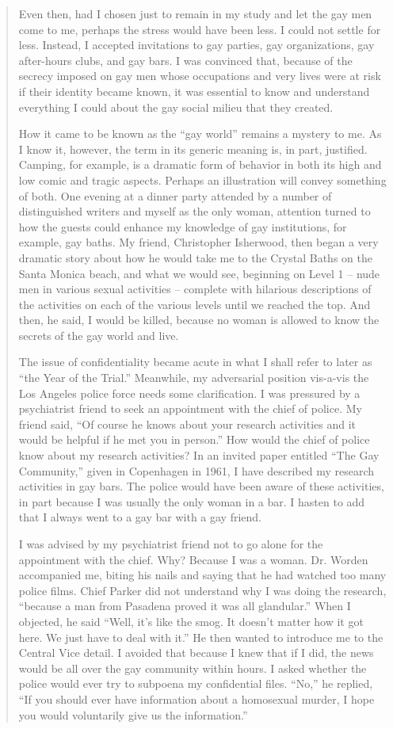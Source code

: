 \begin{refsection}
\begin{quote}
Even then, had I chosen just to remain in my study and let the gay men come to me, perhaps the stress would have been less. I could not settle for less. Instead, I accepted invitations to gay parties, gay organizations, gay after-hours clubs, and gay bars. I was convinced that, because of the secrecy imposed on gay men whose occupations and very lives were at risk if their identity became known, it was essential to know and understand everything I could about the gay social milieu that they created.

How it came to be known as the ``gay world'' remains a mystery to me. As I know it, however, the term in its generic meaning is, in part, justified. Camping, for example, is a dramatic form of behavior in both its high and low comic and tragic aspects. Perhaps an illustration will convey something of both. One evening at a dinner party attended by a number of distinguished writers and myself as the only woman, attention turned to how the guests could enhance my knowledge of gay institutions, for example, gay baths. My friend, Christopher Isherwood, then began a very dramatic story about how he would take me to the Crystal Baths on the Santa Monica beach, and what we would see, beginning on Level 1 – nude men in various sexual activities – complete with hilarious descriptions of the activities on each of the various levels until we reached the top. And then, he said, I would be killed, because no woman is allowed to know the secrets of the gay world and live.

The issue of confidentiality became acute in what I shall refer to later as ``the Year of the Trial.'' Meanwhile, my adversarial position vis-a-vis the Los Angeles police force needs some clarification. I was pressured by a psychiatrist friend to seek an appointment with the chief of police. My friend said, ``Of course he knows about your research activities and it would be helpful if he met you in person.'' How would the chief of police know about my research activities? In an invited paper entitled ``The Gay Community,'' given in Copenhagen in 1961, I have described my research activities in gay bars. The police would have been aware of these activities, in part because I was usually the only woman in a bar. I hasten to add that I always went to a gay bar with a gay friend.

I was advised by my psychiatrist friend not to go alone for the appointment with the chief. Why? Because I was a woman. Dr. Worden accompanied me, biting his nails and saying that he had watched too many police films. Chief Parker did not understand why I was doing the research, ``because a man from Pasadena proved it was all glandular.'' When I objected, he said ``Well, it's like the smog. It doesn't matter how it got here. We just have to deal with it.'' He then wanted to introduce me to the Central Vice detail. I avoided that because I knew that if I did, the news would be all over the gay community within hours. I asked whether the police would ever try to subpoena my confidential files. ``No,'' he replied, ``If you should ever have information about a homosexual murder, I hope you would voluntarily give us the information.''


\end{quote}
\end{refsection}
